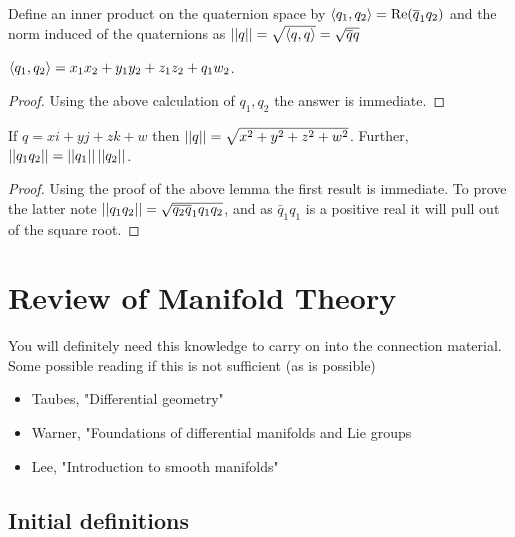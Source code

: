 \documentclass{article}
\begin{document}
\begin{definition}
	Define an inner product on the quaternion space by $\left\langle q_1,q_2 \right\rangle = \operatorname{Re}(\overline{q}_1 q_2)$ and the norm induced of the quaternions as $\left\lvert\left\lvert q \right\rvert\right\rvert = \sqrt{\left\langle q,q \right\rangle}=\sqrt{\overline{q}q}$ 
\end{definition}

\begin{lemma}
	$\left\langle q_1,q_2 \right\rangle = x_1x_2 + y_1y_2 + z_1z_2 + q_1w_2$. 
\end{lemma}
\begin{proof}
	Using the above calculation of $q_1,q_2$ the answer is immediate. 
\end{proof}

\begin{lemma}
If $q = xi + yj + zk + w$ then $\left\lvert\left\lvert q \right\rvert\right\rvert = \sqrt{x^2 + y^2 + z^2 + w^2}$. Further, $\left\lvert\left\lvert q_1 q_2 \right\rvert\right\rvert = \left\lvert\left\lvert q_1 \right\rvert\right\rvert\left\lvert\left\lvert q_2 \right\rvert\right\rvert$. 
\end{lemma}
\begin{proof}
	Using the proof of the above lemma the first result is immediate. To prove the latter note $\left\lvert\left\lvert q_1 q_2 \right\rvert\right\rvert = \sqrt{\overline{q_2} \overline{q}_1 q_1 q_2}$, and as $\bar{q}_1 q_1$ is a positive real it will pull out of the square root. 
\end{proof}

\section{Review of Manifold Theory}
You will definitely need this knowledge to carry on into the connection material. Some possible reading if this is not sufficient (as is possible)
\begin{itemize}
	\item Taubes, "Differential geometry"
	\item Warner, "Foundations of differential manifolds and Lie groups
	\item Lee, "Introduction to smooth manifolds"
\end{itemize}
\subsection{Initial definitions}
\end{document}
